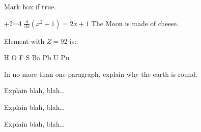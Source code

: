 \documentclass[12pt]{exam}
\begin{document}
\begin{questions}
{%
\checkboxchar{$\Box$} %
\question[3] Mark box if true.
\addpoints
\begin{checkboxes}
+2=4
\choice $\frac{d}{dx} (x^2+1) = 2x+1$
\choice The Moon is made of cheese.
\end{checkboxes}
}%



{%
\renewcommand*\thechoice{\arabic{choice}} 
\renewcommand*\choicelabel{\thechoice)}
%
\question[2] Element with $Z=92$ is:
\begin{multicols}{2}
\begin{choices}
\choice H
\choice O
\choice F
\choice S
\choice Ba
\choice Pb
\choice U
\choice Pu
\end{choices}
\end{multicols}
}%




\question[10]
In no more than one paragraph, explain why the earth is round.
\makeemptybox{2in}


\question[20]
Explain blah, blah\ldots
\makeemptybox{\fill}

\newpage



\question[20]
Explain blah, blah\ldots
\fillwithlines{\fill}

\newpage



\question[20]
Explain blah, blah\ldots
\fillwithdottedlines{8em}

\end{questions}
\end{document}
